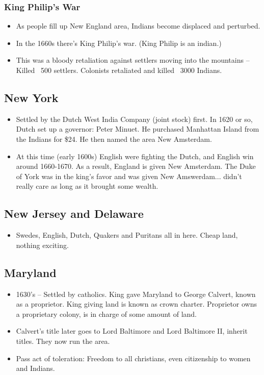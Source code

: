 \documentclass{article}
\begin{document}
      \subsubsection{King Philip's War}
        \begin{itemize}
          \item As people fill up New England area, Indians become displaced and perturbed.
          \item In the 1660s there's King Philip's war. (King Philip is an indian.)
          \item This was a bloody retaliation against settlers moving into the mountains -- Killed ~500 settlers. Colonists retaliated and killed ~3000 Indians.
        \end{itemize}

    \subsection{New York}
      \begin{itemize}
        \item Settled by the Dutch West India Company (joint stock) first. In 1620 or so, Dutch set up a governor: Peter Minuet. He purchased Manhattan Island from the Indians for \$24. He then named the area New Amsterdam.
        \item At this time (early 1600s) English were fighting the Dutch, and English win around 1660-1670. As a result, England is given New Amsterdam. The Duke of York was in the king's favor and was given New Amswerdam... didn't really care as long as it brought some wealth. 
      \end{itemize}

    \subsection{New Jersey and Delaware}
      \begin{itemize}
        \item Swedes, English, Dutch, Quakers and Puritans all in here. Cheap land, nothing exciting.
      \end{itemize}

    \subsection{Maryland}
      \begin{itemize}
        \item 1630's -- Settled by catholics. King gave Maryland to George Calvert, known as a proprietor. King giving land is known as crown charter. Proprietor owns a proprietary colony, is in charge of some amount of land. 
        \item Calvert's title later goes to Lord Baltimore and Lord Baltimore II, inherit titles. They now run the area. 
        \item Pass act of toleration: Freedom to all christians, even citizenship to women and Indians.
      \end{itemize}
\end{document}
